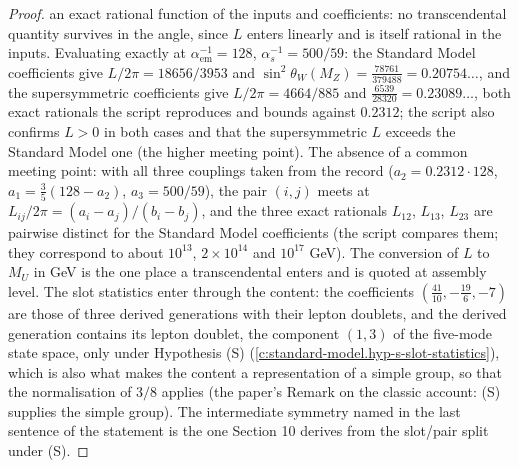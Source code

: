 \documentclass[11pt]{article}
\theoremstyle{definition}
\theoremstyle{plain}
\begin{document}
\begin{proof}
an exact rational function of the inputs and coefficients: no transcendental quantity survives in the angle, since $L$ enters linearly and is itself rational in the inputs. Evaluating exactly at $\alpha_{\mathrm{em}}^{-1} = 128$, $\alpha_{s}^{-1} = 500/59$: the Standard Model coefficients give $L/2\pi = 18656/3953$ and $\sin^{2}\theta_{W}(M_{Z}) = \tfrac{78761}{379488} = 0.20754\ldots$, and the supersymmetric coefficients give $L/2\pi = 4664/885$ and $\tfrac{6539}{28320} = 0.23089\ldots$, both exact rationals the script reproduces and bounds against $0.2312$; the script also confirms $L > 0$ in both cases and that the supersymmetric $L$ exceeds the Standard Model one (the higher meeting point). The absence of a common meeting point: with all three couplings taken from the record ($a_{2} = 0.2312 \cdot 128$, $a_{1} = \tfrac35(128 - a_{2})$, $a_{3} = 500/59$), the pair $(i, j)$ meets at $L_{ij}/2\pi = (a_{i} - a_{j})/(b_{i} - b_{j})$, and the three exact rationals $L_{12}$, $L_{13}$, $L_{23}$ are pairwise distinct for the Standard Model coefficients (the script compares them; they correspond to about $10^{13}$, $2 \times 10^{14}$ and $10^{17}$ GeV). The conversion of $L$ to $M_{U}$ in GeV is the one place a transcendental enters and is quoted at assembly level. The slot statistics enter through the content: the coefficients $(\tfrac{41}{10}, -\tfrac{19}{6}, -7)$ are those of three derived generations with their lepton doublets, and the derived generation contains its lepton doublet, the component $(1,3)$ of the five-mode state space, only under Hypothesis (S) (\ref{c:standard-model.hyp-s-slot-statistics}), which is also what makes the content a representation of a simple group, so that the normalisation of $3/8$ applies (the paper's Remark on the classic account: (S) supplies the simple group). The intermediate symmetry named in the last sentence of the statement is the one Section 10 derives from the slot/pair split under (S).

\end{proof}
\end{document}
